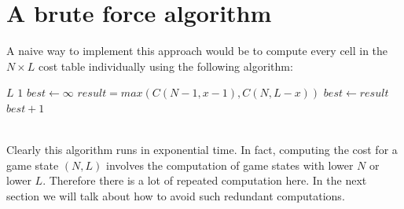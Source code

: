 \documentclass[12pt,a4paper,oneside]{report}
\begin{document}
\section{A brute force algorithm}
A naive way to implement this approach would be to compute every cell in the $N \times L$ cost table individually using the following algorithm:
\begin{algorithm}
\caption{$C(N, L)$}
\begin{algorithmic}[1]
	\RETURN $L$
	\RETURN $1$
\ENDIF
\STATE $best \leftarrow \infty$
	\STATE $result = max(C(N - 1, x - 1), C(N, L - x))$
		\STATE $best \leftarrow result$
	\ENDIF
\ENDFOR
\RETURN $best + 1$
\end{algorithmic}
\end{algorithm}
~\\
Clearly this algorithm runs in exponential time. In fact, computing the cost for a game state $(N, L)$ involves the computation of game states with lower $N$ or lower $L$. Therefore there is a lot of repeated computation here. In the next section we will talk about how to avoid such redundant computations.
\end{document}
